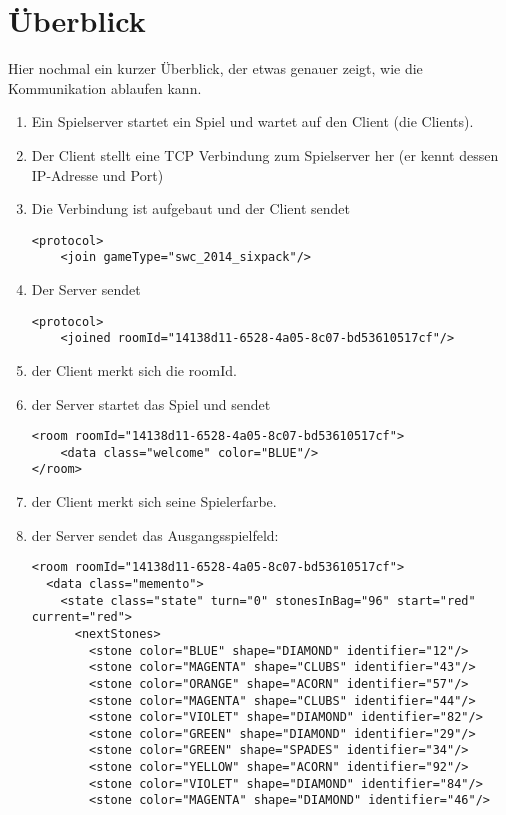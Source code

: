 \documentclass[12pt,a4paper, ngerman, oneside]{scrartcl}
\begin{document}
\newpage
\part{Überblick}
Hier nochmal ein kurzer Überblick, der etwas genauer zeigt, wie die Kommunikation ablaufen kann.\bigskip\\

\begin{enumerate}
\item Ein Spielserver startet ein Spiel und wartet auf den Client (die Clients).
\item Der Client stellt eine TCP Verbindung zum Spielserver her (er kennt dessen IP-Adresse und Port)
\item Die Verbindung ist aufgebaut und der Client sendet \begin{verbatim}
<protocol>
    <join gameType="swc_2014_sixpack"/>
\end{verbatim}
\item Der Server sendet \begin{verbatim}
<protocol>
    <joined roomId="14138d11-6528-4a05-8c07-bd53610517cf"/>
\end{verbatim}
\item der Client merkt sich die roomId.
\item der Server startet das Spiel und sendet \begin{verbatim}
<room roomId="14138d11-6528-4a05-8c07-bd53610517cf">
    <data class="welcome" color="BLUE"/>
</room>
\end{verbatim}
\item der Client merkt sich seine Spielerfarbe.
\item der Server sendet das Ausgangsspielfeld: 
\begin{verbatim}
<room roomId="14138d11-6528-4a05-8c07-bd53610517cf">
  <data class="memento">
    <state class="state" turn="0" stonesInBag="96" start="red" current="red">
      <nextStones>
        <stone color="BLUE" shape="DIAMOND" identifier="12"/>
        <stone color="MAGENTA" shape="CLUBS" identifier="43"/>
        <stone color="ORANGE" shape="ACORN" identifier="57"/>
        <stone color="MAGENTA" shape="CLUBS" identifier="44"/>
        <stone color="VIOLET" shape="DIAMOND" identifier="82"/>
        <stone color="GREEN" shape="DIAMOND" identifier="29"/>
        <stone color="GREEN" shape="SPADES" identifier="34"/>
        <stone color="YELLOW" shape="ACORN" identifier="92"/>
        <stone color="VIOLET" shape="DIAMOND" identifier="84"/>
        <stone color="MAGENTA" shape="DIAMOND" identifier="46"/>

\end{verbatim}
\end{enumerate}
\end{document}
